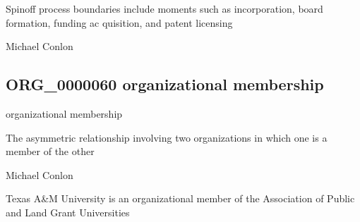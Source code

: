 \documentclass[letterpaper,10pt,english]{sphinxmanual}
\begin{document}
\begin{sphinxShadowBox}

\sphinxAtStartPar
Spin\sphinxhyphen{}off process boundaries include moments such as incorporation, board formation, funding ac quisition, and patent licensing
\end{sphinxShadowBox}

\begin{sphinxShadowBox}

\sphinxAtStartPar
Michael Conlon 
\end{sphinxShadowBox}
\begin{quote}

\ignorespaces \end{quote}


\subsection{ORG\_0000060 \sphinxhyphen{} organizational membership}
\label{\detokenize{doc-ORG_0000060:org-0000060-organizational-membership}}\label{\detokenize{doc-ORG_0000060:index-0}}\label{\detokenize{doc-ORG_0000060::doc}}
\begin{sphinxShadowBox}

\sphinxAtStartPar
organizational membership
\end{sphinxShadowBox}

\begin{sphinxShadowBox}

\sphinxAtStartPar
The asymmetric relationship involving two organizations in which one is a member of the other
\end{sphinxShadowBox}

\begin{sphinxShadowBox}

\sphinxAtStartPar
Michael Conlon 
\end{sphinxShadowBox}

\begin{sphinxShadowBox}

\sphinxAtStartPar
Texas A\&M University is an organizational member of the Association of Public and Land Grant Universities
\end{sphinxShadowBox}
\end{document}
